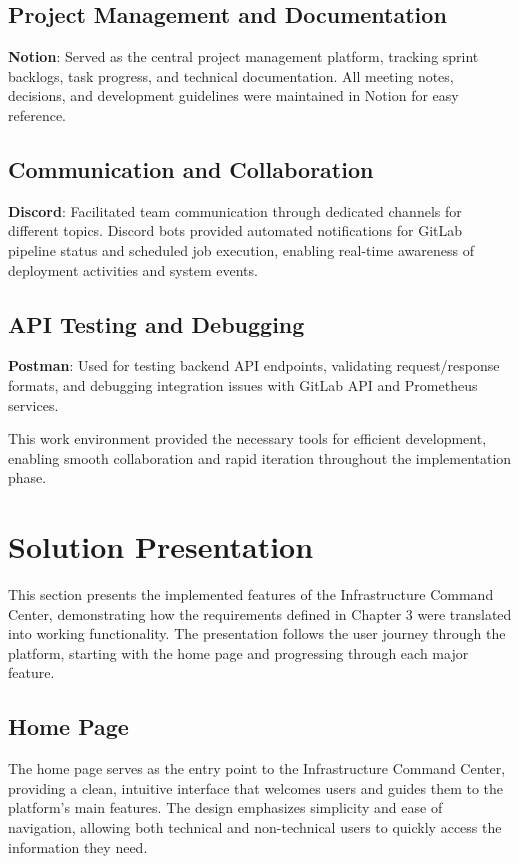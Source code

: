 \subsection{Project Management and Documentation}

\textbf{Notion}: Served as the central project management platform, tracking sprint backlogs, task progress, and technical documentation. All meeting notes, decisions, and development guidelines were maintained in Notion for easy reference.

\subsection{Communication and Collaboration}

\textbf{Discord}: Facilitated team communication through dedicated channels for different topics. Discord bots provided automated notifications for GitLab pipeline status and scheduled job execution, enabling real-time awareness of deployment activities and system events.

\subsection{API Testing and Debugging}

\textbf{Postman}: Used for testing backend API endpoints, validating request/response formats, and debugging integration issues with GitLab API and Prometheus services.

This work environment provided the necessary tools for efficient development, enabling smooth collaboration and rapid iteration throughout the implementation phase.

\section{Solution Presentation}

This section presents the implemented features of the Infrastructure Command Center, demonstrating how the requirements defined in Chapter 3 were translated into working functionality. The presentation follows the user journey through the platform, starting with the home page and progressing through each major feature.

\subsection{Home Page}

The home page serves as the entry point to the Infrastructure Command Center, providing a clean, intuitive interface that welcomes users and guides them to the platform's main features. The design emphasizes simplicity and ease of navigation, allowing both technical and non-technical users to quickly access the information they need.

